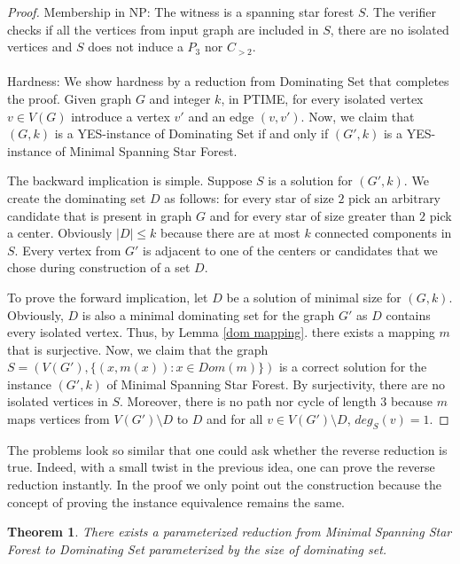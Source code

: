 \documentclass[en]{pracamgr}
\newtheorem{theorem}{Theorem}
\newcommand{\mssfp}{{\sc Minimal Spanning Star Forest}}
\newcommand{\domset}{dominating set}
\newcommand{\domsetp}{{\sc Dominating Set}}
\begin{document}
\begin{proof}
	Membership in NP: The witness is a spanning star forest $S$. The verifier checks if all the vertices from input graph are included in $S$, there are no isolated vertices and $S$ does not induce a $P_3$ nor $C_{> 2}$.
	\\\\
	Hardness: We show hardness by a reduction from \domsetp{} that completes the proof. Given graph $G$ and integer $k$, in PTIME, for every isolated vertex $v \in V(G)$ introduce a vertex $v'$ and an edge $(v,v')$. Now, we claim that $(G,k)$ is a YES-instance of \domsetp{} if and only if $(G',k)$ is a YES-instance of \mssfp{}. 
	
	The backward implication is simple. Suppose $S$ is a solution for $(G',k)$. We create the \domset{} $D$ as follows: for every star of size $2$ pick an arbitrary candidate that is present in graph $G$ and for every star of size greater than $2$ pick a center. Obviously $|D| \leq k$ because there are at most $k$ connected components in $S$. Every vertex from $G'$ is adjacent to one of the centers or candidates that we chose during construction of a set $D$.
	
	To prove the forward implication, let $D$ be a solution of minimal size for $(G,k)$. Obviously, $D$ is also a minimal dominating set for the graph $G'$ as $D$ contains every isolated vertex. Thus, by Lemma \ref{dom mapping}. there exists a mapping $m$ that is surjective. Now, we claim that the graph $S=(V(G'),\{(x,m(x)): x \in Dom(m)\})$ is a correct solution for the instance $(G',k)$ of \mssfp{}. By surjectivity, there are no isolated vertices in $S$. Moreover, there is no path nor cycle of length $3$ because $m$ maps vertices from $V(G') \setminus D$ to $D$ and for all $v \in V(G') \setminus D$, $deg_S(v)=1$.
	
\end{proof}

The problems look so similar that one could ask whether the reverse reduction is true. Indeed, with a small twist in the previous idea, one can prove the reverse reduction instantly. In the proof we only point out the construction because the concept of proving the instance equivalence remains the same.

\begin{theorem}\label{ssf dom}
	There exists a parameterized reduction from \mssfp{} to \domsetp{} parameterized by the size of dominating set.
\end{theorem}
\end{document}
